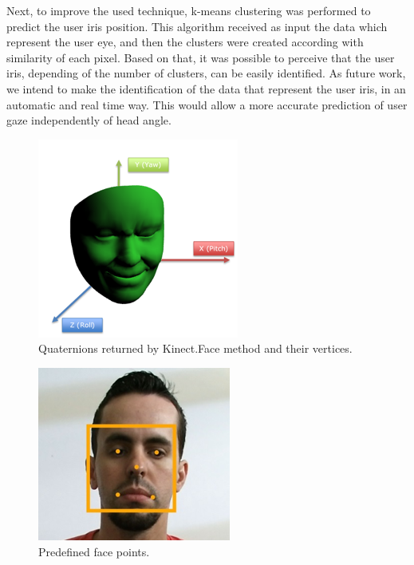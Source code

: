 \documentclass[10pt, conference]{IEEEtran}
\begin{document}
Next, to improve the used technique, k-means clustering was performed to predict the user iris position. 
This algorithm received as input the data which represent the user eye, and then the clusters were created according with similarity of each pixel. 
Based on that, it was possible to perceive that the user iris, depending of the number of clusters, can be easily identified.
As future work, we intend to make the identification of the data that represent the user iris, in an automatic and real time way. 
This would allow a more accurate prediction of user gaze independently of head angle.

\begin{figure}[t]
	\centering
	\includegraphics{figures/pic4.png}
    \caption{Quaternions returned by Kinect.Face method and their vertices.}
    \label{fig:fig3}
\end{figure}

\begin{figure}[t]
	\centering
	\includegraphics{figures/pic5.png}
    \caption{Predefined face points.}
    \label{fig:fig4}
\end{figure}
\end{document}
